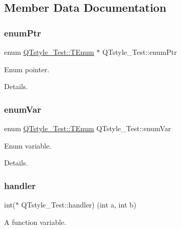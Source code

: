 \subsection{Member Data Documentation}
\mbox{\label{class_q_tstyle___test_a973a4566c9a036f4eca508ba5fe80dcb}} 
\subsubsection{\texorpdfstring{enum\+Ptr}{enumPtr}}
{\footnotesize\ttfamily enum \mbox{\hyperlink{class_q_tstyle___test_a0525f798cda415a94fedeceb806d2c49}{Q\+Tstyle\+\_\+\+Test\+::\+T\+Enum}}
         $\ast$ Q\+Tstyle\+\_\+\+Test\+::enum\+Ptr}



Enum pointer. 

Details. \mbox{\label{class_q_tstyle___test_adb265d815b43f1f7f0de0e8b8852a5d0}} 
\subsubsection{\texorpdfstring{enum\+Var}{enumVar}}
{\footnotesize\ttfamily enum \mbox{\hyperlink{class_q_tstyle___test_a0525f798cda415a94fedeceb806d2c49}{Q\+Tstyle\+\_\+\+Test\+::\+T\+Enum}}
          Q\+Tstyle\+\_\+\+Test\+::enum\+Var}



Enum variable. 

Details. \mbox{\label{class_q_tstyle___test_a79dd4e5498f09057775a819d911349e2}} 
\subsubsection{\texorpdfstring{handler}{handler}}
{\footnotesize\ttfamily int($\ast$ Q\+Tstyle\+\_\+\+Test\+::handler) (int a, int b)}



A function variable. 

